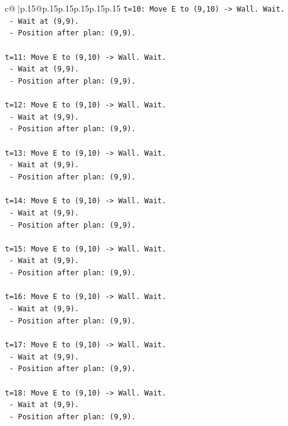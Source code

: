 \documentclass{article}
\begin{document}
{\begin{supertabular}{c@{$\;$}|p{.15\linewidth}@{}p{.15\linewidth}p{.15\linewidth}p{.15\linewidth}p{.15\linewidth}p{.15\linewidth}}
{{{\texttt{t=10: Move E to (9,10) {-}> Wall. Wait.} \\
\texttt{   {-} Wait at (9,9).} \\
\texttt{   {-} Position after plan: (9,9).} \\
\\ 
\texttt{t=11: Move E to (9,10) {-}> Wall. Wait.} \\
\texttt{   {-} Wait at (9,9).} \\
\texttt{   {-} Position after plan: (9,9).} \\
\\ 
\texttt{t=12: Move E to (9,10) {-}> Wall. Wait.} \\
\texttt{   {-} Wait at (9,9).} \\
\texttt{   {-} Position after plan: (9,9).} \\
\\ 
\texttt{t=13: Move E to (9,10) {-}> Wall. Wait.} \\
\texttt{   {-} Wait at (9,9).} \\
\texttt{   {-} Position after plan: (9,9).} \\
\\ 
\texttt{t=14: Move E to (9,10) {-}> Wall. Wait.} \\
\texttt{   {-} Wait at (9,9).} \\
\texttt{   {-} Position after plan: (9,9).} \\
\\ 
\texttt{t=15: Move E to (9,10) {-}> Wall. Wait.} \\
\texttt{   {-} Wait at (9,9).} \\
\texttt{   {-} Position after plan: (9,9).} \\
\\ 
\texttt{t=16: Move E to (9,10) {-}> Wall. Wait.} \\
\texttt{   {-} Wait at (9,9).} \\
\texttt{   {-} Position after plan: (9,9).} \\
\\ 
\texttt{t=17: Move E to (9,10) {-}> Wall. Wait.} \\
\texttt{   {-} Wait at (9,9).} \\
\texttt{   {-} Position after plan: (9,9).} \\
\\ 
\texttt{t=18: Move E to (9,10) {-}> Wall. Wait.} \\
\texttt{   {-} Wait at (9,9).} \\
\texttt{   {-} Position after plan: (9,9).} \\
}}}
\end{supertabular}}
\end{document}
